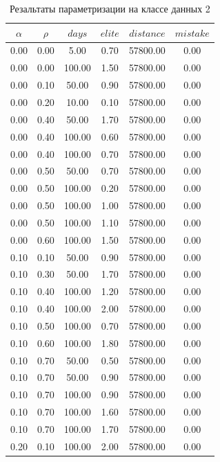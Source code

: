 \begin{table}
	\caption{Резальтаты параметризации на классе данных 2 \label{tbl:test2}}
	\begin{tabular}[c]{|c|c|c|c|c|c|}
        \hline
		$\alpha$ & $\rho$ & $days$ & $elite$ & $distance$ & $mistake$ \\
		\hline  
        0.00 & 0.00 & 5.00 & 0.70 & 57800.00 & 0.00 \\
        0.00 & 0.00 & 100.00 & 1.50 & 57800.00 & 0.00 \\
        0.00 & 0.10 & 50.00 & 0.90 & 57800.00 & 0.00 \\
        0.00 & 0.20 & 10.00 & 0.10 & 57800.00 & 0.00 \\
        0.00 & 0.40 & 50.00 & 1.70 & 57800.00 & 0.00 \\
        0.00 & 0.40 & 100.00 & 0.60 & 57800.00 & 0.00 \\
        0.00 & 0.40 & 100.00 & 0.70 & 57800.00 & 0.00 \\
        0.00 & 0.50 & 50.00 & 0.70 & 57800.00 & 0.00 \\
        0.00 & 0.50 & 100.00 & 0.20 & 57800.00 & 0.00 \\
        0.00 & 0.50 & 100.00 & 1.00 & 57800.00 & 0.00 \\
        0.00 & 0.50 & 100.00 & 1.10 & 57800.00 & 0.00 \\
        0.00 & 0.60 & 100.00 & 1.50 & 57800.00 & 0.00 \\
        0.10 & 0.10 & 50.00 & 0.90 & 57800.00 & 0.00 \\
        0.10 & 0.30 & 50.00 & 1.70 & 57800.00 & 0.00 \\
        0.10 & 0.40 & 100.00 & 1.20 & 57800.00 & 0.00 \\
        0.10 & 0.40 & 100.00 & 2.00 & 57800.00 & 0.00 \\
        0.10 & 0.50 & 100.00 & 0.70 & 57800.00 & 0.00 \\
        0.10 & 0.60 & 100.00 & 1.80 & 57800.00 & 0.00 \\
        0.10 & 0.70 & 50.00 & 0.50 & 57800.00 & 0.00 \\
        0.10 & 0.70 & 50.00 & 0.90 & 57800.00 & 0.00 \\
        0.10 & 0.70 & 100.00 & 0.90 & 57800.00 & 0.00 \\
        0.10 & 0.70 & 100.00 & 1.60 & 57800.00 & 0.00 \\
        0.10 & 0.70 & 100.00 & 1.70 & 57800.00 & 0.00 \\
        0.20 & 0.10 & 100.00 & 2.00 & 57800.00 & 0.00 \\

\end{tabular}
\end{table}
